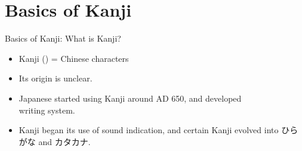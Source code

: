 \documentclass[12pt,aspectratio=169]{beamer}
\newenvironment{items}
	{\begin{itemize}
		\setlength\itemsep{5pt}
	}{\end{itemize}}
\begin{document}
	\section{Basics of Kanji}

	\begin{frame}{Basics of Kanji: What is Kanji?}
		\begin{items}
			\item Kanji () = Chinese characters
			\item Its origin is unclear.
			\item Japanese started using Kanji around AD 650, and developed \\  writing system.
			\item Kanji began its use of sound indication, and certain Kanji evolved into ひらがな and カタカナ.
		\end{items}
	\end{frame}
\end{document}
